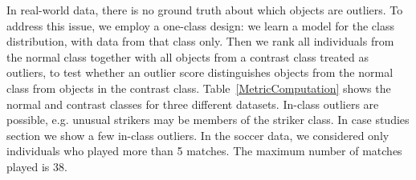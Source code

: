 \documentclass[conference]{IEEEtran}
\begin{document}
					
					In real-world data, there is no ground truth about which objects are outliers. To address this issue, we employ a one-class design: we learn a model for the class distribution, with data from that class only. Then we rank all individuals from the normal class together with all objects from a contrast class treated as outliers, to test whether an outlier score distinguishes objects from the normal class from objects in the contrast class. Table~\ref{MetricComputation} shows the normal and contrast classes for three different datasets.  In-class outliers are possible, e.g. unusual strikers may be members of the striker class. In case studies section we show a few in-class outliers. In the soccer data, we considered only individuals who played more than 5 matches. The maximum number of matches played is 38.
%
					
					
\end{document}

